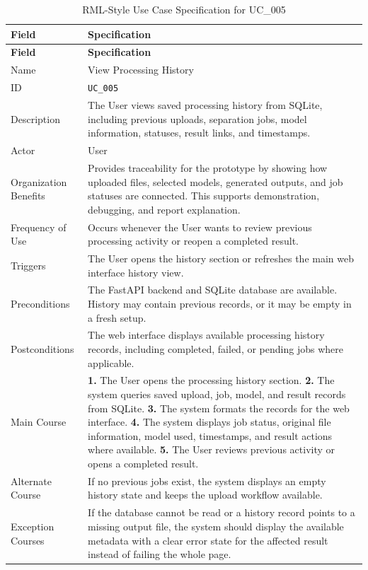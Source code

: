 \clearpage
\begin{longtable}{@{}p{} p{}@{}}
  \caption{RML-Style Use Case Specification for UC\_005}
  \label{tab:uc005-view-processing-history} \\
  \toprule
  \textbf{Field} & \textbf{Specification} \\
  \midrule
  \endfirsthead
  \toprule
  \textbf{Field} & \textbf{Specification} \\
  \midrule
  \endhead
  \bottomrule
  \endfoot
  Name & View Processing History \\
  ID & \texttt{UC\_005} \\
  Description & The User views saved processing history from SQLite, including previous uploads, separation jobs, model information, statuses, result links, and timestamps. \\
  Actor & User \\
  Organization Benefits & Provides traceability for the prototype by showing how uploaded files, selected models, generated outputs, and job statuses are connected. This supports demonstration, debugging, and report explanation. \\
  Frequency of Use & Occurs whenever the User wants to review previous processing activity or reopen a completed result. \\
  Triggers & The User opens the history section or refreshes the main web interface history view. \\
  Preconditions & The FastAPI backend and SQLite database are available. History may contain previous records, or it may be empty in a fresh setup. \\
  Postconditions & The web interface displays available processing history records, including completed, failed, or pending jobs where applicable. \\
  Main Course & \textbf{1.} The User opens the processing history section. \newline
  \textbf{2.} The system queries saved upload, job, model, and result records from SQLite. \newline
  \textbf{3.} The system formats the records for the web interface. \newline
  \textbf{4.} The system displays job status, original file information, model used, timestamps, and result actions where available. \newline
  \textbf{5.} The User reviews previous activity or opens a completed result. \\
  Alternate Course & If no previous jobs exist, the system displays an empty history state and keeps the upload workflow available. \\
  Exception Courses & If the database cannot be read or a history record points to a missing output file, the system should display the available metadata with a clear error state for the affected result instead of failing the whole page. \\
\end{longtable}

